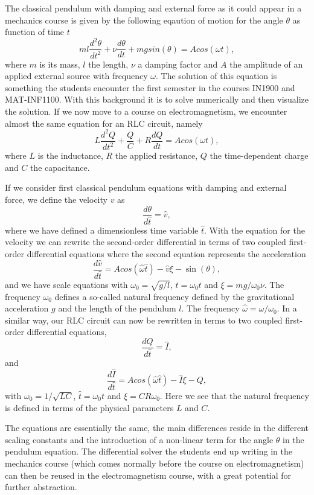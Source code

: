 \documentclass[graybox,envcountchap,sectrefs]{svmult}
\begin{document}
The classical pendulum with damping and external force as it could
appear in a mechanics course is given by the following eqaution of
motion for the angle $\theta$ as function of time $t$
\[
  ml\frac{d^2\theta}{dt^2}+\nu\frac{d\theta}{dt}  +mgsin(\theta)=Acos(\omega t),
\]
where $m$ is its mass, $l$ the length, $\nu$ a damping factor and $A$
the amplitude of an applied external source with frequency
$\omega$. The solution of this equation is something the students
encounter the first semester in the courses IN1900 and
MAT-INF1100. With this background it is to solve numerically and then
visualize the solution.  If we now move to a course on
electromagnetism, we encounter almost the same equation for an RLC
circuit, namely
\[
L\frac{d^2Q}{dt^2}+\frac{Q}{C}+R\frac{dQ}{dt}=Acos(\omega t),
\]
where $L$ is the inductance, $R$ the applied resistance, $Q$ the
time-dependent charge and $C$ the capacitance.

If we consider first 
classical pendulum equations with damping and external force, we define the velocity $v$ as 
\[
   \frac{d\theta}{d\hat{t}} =\hat{v},
\]
where we have defined a dimensionless time variable $\hat{t}$. With
the equation for the velocity we can rewrite the second-order
differential in terms of two coupled first-order differential
equations where the second equation represents the acceleration
\[
   \frac{d\hat{v}}{d\hat{t}} =Acos(\hat{\omega} \hat{t})-\hat{v}\xi-\sin(\theta),
\]
and we have scale equations with $\omega_0=\sqrt{g/l}$,
$\hat{t}=\omega_0 t$ and $\xi = mg/\omega_0\nu$. The frequency
$\omega_0$ defines a so-called natural frequency defined by the
gravitational acceleration $g$ and the length of the pendulum $l$. The
frequency $\hat{\omega}= \omega/\omega_0$.  In a similar way, our RLC
circuit can now be rewritten in terms to two coupled first-order
differential equations,
\[
   \frac{dQ}{d\hat{t}} =\hat{I},
\]
and
\[
   \frac{d\hat{I}}{d\hat{t}} =Acos(\hat{\omega} \hat{t})-\hat{I}\xi-Q,
\]
with $\omega_0=1/\sqrt{LC}$, $\hat{t}=\omega_0 t$ and $\xi =
CR\omega_0$. Here we see that the natural frequency is defined in
terms of the physical parameters $L$ and $C$.

The equations are essentially the same, the main differences reside in
the different scaling constants and the introduction of a non-linear
term for the angle $\theta$ in the pendulum equation. The differential
solver the students end up writing in the mechanics course (which
comes normally before the course on electromagnetism) can then be
reused in the electromagnetism course, with a great potential for
further abstraction.
\end{document}
